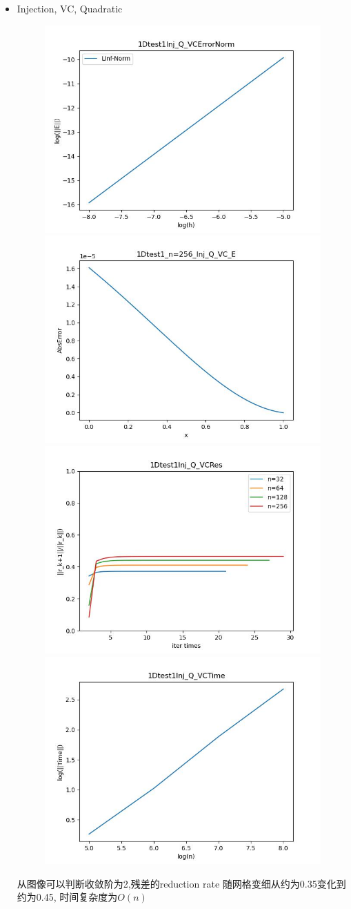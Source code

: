 \documentclass{article}
\begin{document}
\begin{itemize}
    \item Injection, VC, Quadratic
    \begin{figure}[h]
        \centering
        \includegraphics[width=0.35\linewidth]{1Dtest1Inj_Q_VCErrorNorm.jpg}
        \includegraphics[width=0.35\linewidth]{1Dtest1_n=256_Inj_Q_VC_E.jpg}
        \includegraphics[width=0.35\linewidth]{1Dtest1Inj_Q_VCRes.jpg}
        \includegraphics[width=0.35\linewidth]{1Dtest1Inj_Q_VCTime.jpg}
    \end{figure}
    
    从图像可以判断收敛阶为2,残差的reduction rate 随网格变细从约为0.35变化到约为0.45, 时间复杂度为$O(n)$
    \newpage
\end{itemize}
\end{document}
